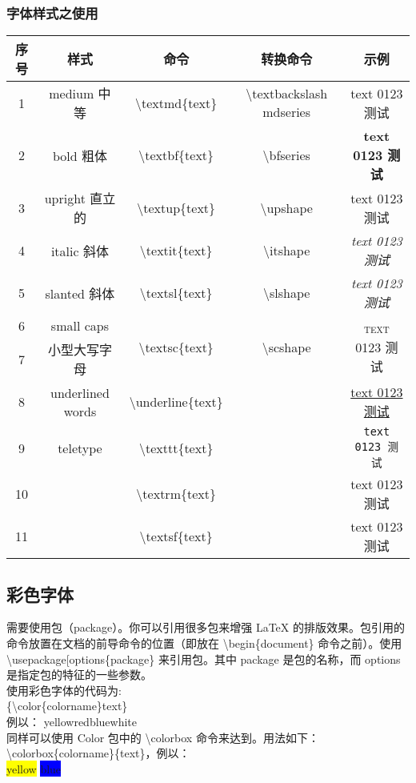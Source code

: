 \documentclass{article}
\begin{document}
\subsubsection{字体样式之使用}
\label{tabular1}
\begin{tabular}{c|c|c|c|c|}\centering
序号&样式&命令&转换命令&示例\\\hline
1&medium 中等		&\textbackslash textmd\{text\}					&\textbackslash textbackslash mdseries	&\textmd{text 0123 测试}\\\hline
2&bold 粗体			&\textbackslash textbf\{text\}					&\textbackslash bfseries					&\textbf{text 0123 测试}\\\hline
3&upright 直立的		&\textbackslash textup\{text\}					&\textbackslash upshape					&\textup{text 0123 测试}\\\hline
4&italic 斜体		&\textbackslash textit\{text\}					&\textbackslash itshape					&\textit{text 0123 测试}\\\hline
5&slanted 斜体		&\textbackslash textsl\{text\}					&\textbackslash slshape					&\textsl{text 0123 测试}\\\hline
6&small caps&\multirow{2}{*}{\textbackslash textsc\{text\}}&\multirow{2}{*}{\textbackslash scshape}&\multirow{2}{*}{\textsc{text 0123 测试}}\\
7&小型大写字母& & &\\\hline
8&underlined words	&\textbackslash underline\{text\}				& 												&\underline{text 0123 测试}\\\hline
9&teletype			&\textbackslash texttt\{text\}					&												&\texttt{text 0123 测试}\\\hline
10&						&\textbackslash textrm\{text\}					&												&\textrm{text 0123 测试}\\\hline
11&						&\textbackslash textsf\{text\}					&												&\textsf{text 0123 测试}
\end{tabular}
\subsection{彩色字体}
需要使用包（package）。你可以引用很多包来增强 LaTeX 的排版效果。包引用的命令放置在文档的前导命令的位置（即放在 \textbackslash begin\{document\} 命令之前）。使用 \textbackslash usepackage[options\{package\} 来引用包。其中 package 是包的名称，而 options 是指定包的特征的一些参数。\\
使用彩色字体的代码为:\\\{\textbackslash color\{colorname\}text\}\\
例以：
{\color{yellow}yellow}{\color{red}red}{\color{blue}blue}{\color{white}white}\\
同样可以使用 Color 包中的 \textbackslash colorbox 命令来达到。用法如下：\\
\textbackslash colorbox\{colorname\}\{text\}，例以：\\
\colorbox{yellow}{yellow} \colorbox{blue}{blue}
\end{document}
